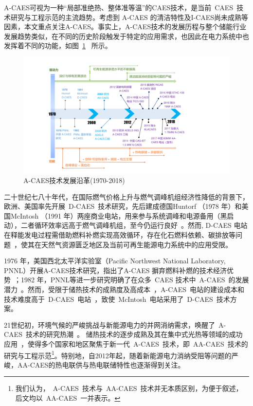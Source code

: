 A-CAES可视为一种“局部准绝热、整体准等温”的CAES技术\cite{Thesis-Zhangxuelin}，是当前~CAES~技术研究与工程示范的主流趋势。考虑到 A-CAES 的清洁特性及I-CAES尚未成熟等因素，本文重点关注A-CAES。事实上，A-CAES技术的发展历程与整个储能行业发展趋势类似，在不同的历史阶段触发于特定的应用需求，也因此在电力系统中也发挥着不同的功能，如图~\ref{fig:CAES-History}~ 所示。

\begin{figure}[H] %
  \centering
  \includegraphics[scale=0.60]{figures/Chap1-4-CAES-History.pdf}
  \caption{A-CAES技术发展沿革(1970-2018)}
  \label{fig:CAES-History}
\end{figure}

二十世纪七八十年代，在国际燃气价格上升与燃气调峰机组经济性降低的背景下，欧洲、美国率先开展~D-CAES~技术研究，先后建成德国Huntorf （1978 年）和美国McIntosh （1991 年）两座商业电站，用来参与系统调峰和电源备用（黑启动），二者循环效率远高于燃气调峰机组，至今仍运行良好~\cite{IEA-EES-09,EES-Review-12,CAES-Review-18-Rui-operation}。然而, D-CAES 电站在释能发电过程需借助燃料补燃实现高效循环，存在化石燃料依赖、碳排放等问题~\cite{ACAES-Green-12,CAES-Huntorf-12}，使其在天然气资源匮乏地区及当前可再生能源电力系统中的应用受限\cite{CAES-Review-18-Rui-operation}。

1976 年，美国西北太平洋实验室（Pacific Northwest National Laboratory, PNNL）开展A-CAES技术研究，指出了A-CAES 摒弃燃料补燃的技术经济优势~\cite{CAES-Review-18-Rui-operation,CAES-Patent-78,Thesis-Zhangyuan}；1982 年，PNNL等进一步研究明确了在众多~CAES 技术中~A-CAES~的发展潜力~\cite{A-CAES-Report-81,A-CAES-Report-82}。然而，受限于储热技术的成熟度及高成本~\cite{AA-CAES-04}，A-CAES~电站的建设成本和技术难度高于~D-CAES~电站~\cite{Thesis-Zhangyuan}，致使~McIntosh~电站采用了~D-CAES~技术方案。

21世纪初，环境气候的严峻挑战与新能源电力的并网消纳需求，唤醒了~A-CAES~技术的研究热潮~\cite{AA-CAES-04}。 储热技术的逐步成熟及其在集中式光热等领域的成功应用~\cite{TES-CSP-review-13}，使得多个国家和地区聚焦于新一代~A-CAES~技术，即~AA-CAES~技术的研究与工程示范\footnote{我们认为，~A-CAES~技术与~AA-CAES~技术并无本质区别，为便于叙述，后文均以~AA-CAES~一并表示。}。特别地，自2012年起，随着新能源电力消纳受阻等问题的严峻，AA-CAES的热电联供与热电联储特性也逐渐得到关注。

